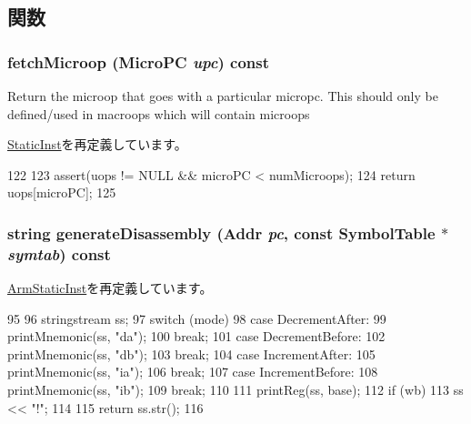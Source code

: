 \subsection{関数}
\hypertarget{classArmISA_1_1RfeOp_ae9e7acd6304ee397f1ab470e283ae76b}{
\subsubsection[{fetchMicroop}]{ fetchMicroop ({\bf MicroPC} {\em upc}) const}}
\label{classArmISA_1_1RfeOp_ae9e7acd6304ee397f1ab470e283ae76b}
Return the microop that goes with a particular micropc. This should only be defined/used in macroops which will contain microops 

\hyperlink{classStaticInst_aa5c7e6f7323850b84dbf5b8e47856173}{StaticInst}を再定義しています。


\begin{DoxyCode}
122     {
123         assert(uops != NULL && microPC < numMicroops);
124         return uops[microPC];
125     }
\end{DoxyCode}
\hypertarget{classArmISA_1_1RfeOp_a3134956ec18bb095818e06eb988f6c55}{
\subsubsection[{generateDisassembly}]{\setlength{\rightskip}{0pt plus 5cm}string generateDisassembly ({\bf Addr} {\em pc}, \/  const SymbolTable $\ast$ {\em symtab}) const}}
\label{classArmISA_1_1RfeOp_a3134956ec18bb095818e06eb988f6c55}


\hyperlink{classArmISA_1_1ArmStaticInst_a95d323a22a5f07e14d6b4c9385a91896}{ArmStaticInst}を再定義しています。


\begin{DoxyCode}
95 {
96     stringstream ss;
97     switch (mode) {
98       case DecrementAfter:
99         printMnemonic(ss, "da");
100         break;
101       case DecrementBefore:
102         printMnemonic(ss, "db");
103         break;
104       case IncrementAfter:
105         printMnemonic(ss, "ia");
106         break;
107       case IncrementBefore:
108         printMnemonic(ss, "ib");
109         break;
110     }
111     printReg(ss, base);
112     if (wb) {
113         ss << "!";
114     }
115     return ss.str();
116 }
\end{DoxyCode}


